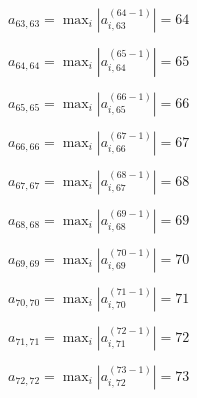 \documentclass[a4paper,12pt]{article}
\begin{document}
$a _{ 63, 63 } =  \max _i |a _{ i, 63 } ^{ (64 - 1) } | = 64$

$a _{ 64, 64 } =  \max _i |a _{ i, 64 } ^{ (65 - 1) } | = 65$

$a _{ 65, 65 } =  \max _i |a _{ i, 65 } ^{ (66 - 1) } | = 66$

$a _{ 66, 66 } =  \max _i |a _{ i, 66 } ^{ (67 - 1) } | = 67$

$a _{ 67, 67 } =  \max _i |a _{ i, 67 } ^{ (68 - 1) } | = 68$

$a _{ 68, 68 } =  \max _i |a _{ i, 68 } ^{ (69 - 1) } | = 69$

$a _{ 69, 69 } =  \max _i |a _{ i, 69 } ^{ (70 - 1) } | = 70$

$a _{ 70, 70 } =  \max _i |a _{ i, 70 } ^{ (71 - 1) } | = 71$

$a _{ 71, 71 } =  \max _i |a _{ i, 71 } ^{ (72 - 1) } | = 72$

$a _{ 72, 72 } =  \max _i |a _{ i, 72 } ^{ (73 - 1) } | = 73$
\end{document}
